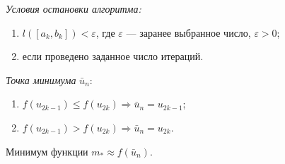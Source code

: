 \textit{Условия остановки алгоритма:}
\begin{enumerate}
	\item $l([a_k, b_k]) < \varepsilon$, где $\varepsilon$ --- заранее выбранное число, $\varepsilon > 0$; 
	
	\item если проведено заданное число итераций.
\end{enumerate}

\textit{Точка минимума} $\bar{u}_n$:
\begin{enumerate}[label={(\alph*)}]
	\item $f(u_{2k - 1}) \leqslant f(u_{2 k}) \Rightarrow \bar{u}_n = u_{2 k - 1}$;
	
	\item $f(u_{2 k - 1}) > f(u_{2k}) \Rightarrow \bar{u}_n = u_{2 k}$.
\end{enumerate}

Минимум функции $m_{\ast} \approx f(\bar{u}_n)$.
\newline